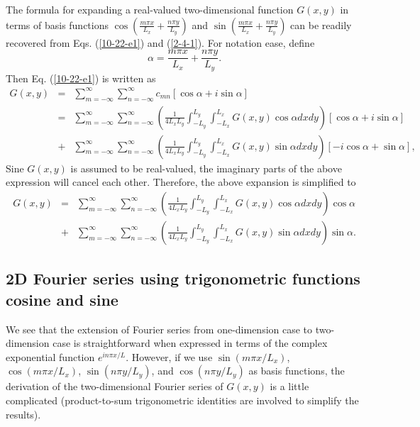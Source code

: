 \documentclass{article}
\begin{document}
The formula for expanding a real-valued two-dimensional function $G (x, y)$ in
terms of basis functions $\cos \left( \frac{m \pi x}{L_x} + \frac{n \pi
y}{L_y} \right)$ and $\sin \left( \frac{m \pi x}{L_x} + \frac{n \pi y}{L_y}
\right)$ can be readily recovered from Eqs. (\ref{10-22-e1}) and
(\ref{2-4-1}). For notation ease, define
\begin{equation}
  \alpha = \frac{m \pi x}{L_x} + \frac{n \pi y}{L_y} .
\end{equation}
Then Eq. (\ref{10-22-e1}) is written as
\begin{eqnarray*}
  G (x, y) & = & \sum_{m = - \infty}^{\infty} \sum_{n = - \infty}^{\infty}
  c_{m n} [\cos \alpha + i \sin \alpha]\\
  & = & \sum_{m = - \infty}^{\infty} \sum_{n = - \infty}^{\infty} \left(
  \frac{1}{4 L_x L_y} \int_{- L_y}^{L_y} \int_{- L_x}^{L_x} G (x, y) \cos
  \alpha d x d y \right)  [\cos \alpha + i \sin \alpha]\\
  & + & \sum_{m = - \infty}^{\infty} \sum_{n = - \infty}^{\infty} \left(
  \frac{1}{4 L_x L_y} \int_{- L_y}^{L_y} \int_{- L_x}^{L_x} G (x, y) \sin
  \alpha d x d y \right) [- i \cos \alpha + \sin \alpha],
\end{eqnarray*}
Sine $G (x, y)$ is assumed to be real-valued, the imaginary parts of the above
expression will cancel each other. Therefore, the above expansion is
simplified to
\begin{eqnarray}
  G (x, y) & = & \sum_{m = - \infty}^{\infty} \sum_{n = - \infty}^{\infty}
  \left( \frac{1}{4 L_x L_y} \int_{- L_y}^{L_y} \int_{- L_x}^{L_x} G (x, y)
  \cos \alpha d x d y \right) \cos \alpha \nonumber\\
  & + & \sum_{m = - \infty}^{\infty} \sum_{n = - \infty}^{\infty} \left(
  \frac{1}{4 L_x L_y} \int_{- L_y}^{L_y} \int_{- L_x}^{L_x} G (x, y) \sin
  \alpha d x d y \right) \sin \alpha . 
\end{eqnarray}


\subsection{2D Fourier series using trigonometric functions cosine and
sine}\label{10-23-8}

We see that the extension of Fourier series from one-dimension case to
two-dimension case is straightforward when expressed in terms of the complex
exponential function $e^{i n \pi x / L}$. However, if we use $\sin (m \pi x /
L_x)$, $\cos (m \pi x / L_x)$, $\sin (n \pi y / L_y)$, and $\cos (n \pi y /
L_y)$ as basis functions, the derivation of the two-dimensional Fourier series
of $G (x, y)$ is a little complicated (product-to-sum trigonometric identities
are involved to simplify the results).
\end{document}
